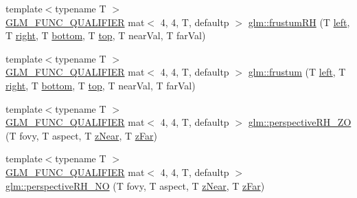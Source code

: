 \begin{DoxyCompactItemize}
\item 
{\footnotesize template$<$typename T $>$ }\\\mbox{\hyperlink{setup_8hpp_a33fdea6f91c5f834105f7415e2a64407}{G\+L\+M\+\_\+\+F\+U\+N\+C\+\_\+\+Q\+U\+A\+L\+I\+F\+I\+ER}} mat$<$ 4, 4, T, defaultp $>$ \mbox{\hyperlink{group__gtc__matrix__transform_ga4366ab45880c6c5f8b3e8c371ca4b136}{glm\+::frustum\+RH}} (T \mbox{\hyperlink{_s_d_l__opengl__glext_8h_a85b8f6c07fbc1fb5d77c2ae090f21995}{left}}, T \mbox{\hyperlink{_s_d_l__opengl__glext_8h_a5ffadbbacc6b89cf6218bc43b384d3fe}{right}}, T \mbox{\hyperlink{_s_d_l__opengl__glext_8h_a95fc257e5ddf46f7db9d5e898cdf1991}{bottom}}, T \mbox{\hyperlink{_s_d_l__opengl__glext_8h_a5ab323daeacf8dfdb8f91132fecdca23}{top}}, T near\+Val, T far\+Val)
\item 
{\footnotesize template$<$typename T $>$ }\\\mbox{\hyperlink{setup_8hpp_a33fdea6f91c5f834105f7415e2a64407}{G\+L\+M\+\_\+\+F\+U\+N\+C\+\_\+\+Q\+U\+A\+L\+I\+F\+I\+ER}} mat$<$ 4, 4, T, defaultp $>$ \mbox{\hyperlink{group__gtc__matrix__transform_ga0bcd4542e0affc63a0b8c08fcb839ea9}{glm\+::frustum}} (T \mbox{\hyperlink{_s_d_l__opengl__glext_8h_a85b8f6c07fbc1fb5d77c2ae090f21995}{left}}, T \mbox{\hyperlink{_s_d_l__opengl__glext_8h_a5ffadbbacc6b89cf6218bc43b384d3fe}{right}}, T \mbox{\hyperlink{_s_d_l__opengl__glext_8h_a95fc257e5ddf46f7db9d5e898cdf1991}{bottom}}, T \mbox{\hyperlink{_s_d_l__opengl__glext_8h_a5ab323daeacf8dfdb8f91132fecdca23}{top}}, T near\+Val, T far\+Val)
\item 
{\footnotesize template$<$typename T $>$ }\\\mbox{\hyperlink{setup_8hpp_a33fdea6f91c5f834105f7415e2a64407}{G\+L\+M\+\_\+\+F\+U\+N\+C\+\_\+\+Q\+U\+A\+L\+I\+F\+I\+ER}} mat$<$ 4, 4, T, defaultp $>$ \mbox{\hyperlink{group__gtc__matrix__transform_ga4da358d6e1b8e5b9ae35d1f3f2dc3b9a}{glm\+::perspective\+R\+H\+\_\+\+ZO}} (T fovy, T aspect, T \mbox{\hyperlink{_s_d_l__opengl__glext_8h_a12d99226e590bbaaf0be69169eeb4834}{z\+Near}}, T \mbox{\hyperlink{_s_d_l__opengl__glext_8h_a1052a8235df129542aea6da80fbec6a1}{z\+Far}})
\item 
{\footnotesize template$<$typename T $>$ }\\\mbox{\hyperlink{setup_8hpp_a33fdea6f91c5f834105f7415e2a64407}{G\+L\+M\+\_\+\+F\+U\+N\+C\+\_\+\+Q\+U\+A\+L\+I\+F\+I\+ER}} mat$<$ 4, 4, T, defaultp $>$ \mbox{\hyperlink{group__gtc__matrix__transform_gad1526cb2cbe796095284e8f34b01c582}{glm\+::perspective\+R\+H\+\_\+\+NO}} (T fovy, T aspect, T \mbox{\hyperlink{_s_d_l__opengl__glext_8h_a12d99226e590bbaaf0be69169eeb4834}{z\+Near}}, T \mbox{\hyperlink{_s_d_l__opengl__glext_8h_a1052a8235df129542aea6da80fbec6a1}{z\+Far}})

\end{DoxyCompactItemize}
